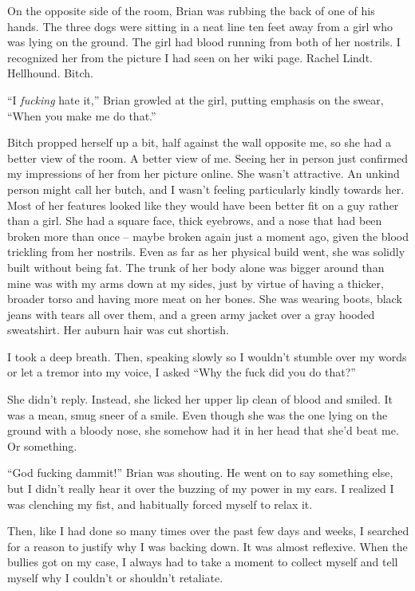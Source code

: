 On the opposite side of the room, Brian was rubbing the back of one of his hands.  The three dogs were sitting in a neat line ten feet away from a girl who was lying on the ground. The girl had blood running from both of her nostrils.  I recognized her from the picture I had seen on her wiki page.  Rachel Lindt.  Hellhound.  Bitch.



``I \emph{fucking} hate it,'' Brian growled at the girl, putting emphasis on the swear, ``When you make me do that.''



Bitch propped herself up a bit, half against the wall opposite me, so she had a better view of the room.  A better view of me.  Seeing her in person just confirmed my impressions of her from her picture online.  She wasn't attractive.  An unkind person might call her butch, and I wasn't feeling particularly kindly towards her.  Most of her features looked like they would have been better fit on a guy rather than a girl.  She had a square face, thick eyebrows, and a nose that had been broken more than once – maybe broken again just a moment ago, given the blood trickling from her nostrils.  Even as far as her physical build went, she was solidly built without being fat.  The trunk of her body alone was bigger around than mine was with my arms down at my sides, just by virtue of having a thicker, broader torso and having more meat on her bones.  She was wearing boots, black jeans with tears all over them, and a green army jacket over a gray hooded sweatshirt.  Her auburn hair was cut shortish.



I took a deep breath.  Then, speaking slowly so I wouldn't stumble over my words or let a tremor into my voice, I asked ``Why the fuck did you do that?''



She didn't reply.  Instead, she licked her upper lip clean of blood and smiled.  It was a mean, smug sneer of a smile.  Even though she was the one lying on the ground with a bloody nose, she somehow had it in her head that she'd beat me.  Or something.



``God fucking dammit!'' Brian was shouting.  He went on to say something else, but I didn't really hear it over the buzzing of my power in my ears.  I realized I was clenching my fist, and habitually forced myself to relax it.



Then, like I had done so many times over the past few days and weeks, I searched for a reason to justify why I was backing down.  It was almost reflexive.  When the bullies got on my case, I always had to take a moment to collect myself and tell myself why I couldn't or shouldn't retaliate.



